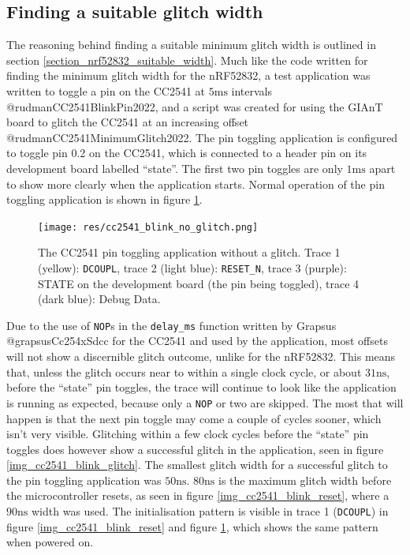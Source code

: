 \hypertarget{finding-a-suitable-glitch-width-1}{%
\subsection{\texorpdfstring{Finding a suitable glitch
width\label{section_cc2541_suitable_width}}{Finding a suitable glitch width}}\label{finding-a-suitable-glitch-width-1}}

The reasoning behind finding a suitable minimum glitch width is outlined
in section \ref{section_nrf52832_suitable_width}. Much like the code
written for finding the minimum glitch width for the nRF52832, a test
application was written to toggle a pin on the CC2541 at
\(5\si{\milli\second}\) intervals @rudmanCC2541BlinkPin2022, and a
script was created for using the GIAnT board to glitch the CC2541 at an
increasing offset @rudmanCC2541MinimumGlitch2022. The pin toggling
application is configured to toggle pin 0.2 on the CC2541, which is
connected to a header pin on its development board labelled ``state''.
The first two pin toggles are only \(1\si{\milli\second}\) apart to show
more clearly when the application starts. Normal operation of the pin
toggling application is shown in figure
\ref{img_cc2541_blink_no_glitch}.

\begin{figure}
\centering
\texttt{[image: res/cc2541\_blink\_no\_glitch.png]}
\caption{The CC2541 pin toggling application without a glitch. Trace 1
(yellow): \texttt{DCOUPL}, trace 2 (light blue): \texttt{RESET\_N},
trace 3 (purple): STATE on the development board (the pin being
toggled), trace 4 (dark blue): Debug Data.
\label{img_cc2541_blink_no_glitch}}
\end{figure}

Due to the use of \texttt{NOP}s in the \texttt{delay\_ms} function
written by Grapsus @grapsusCc254xSdcc for the CC2541 and used by the
application, most offsets will not show a discernible glitch outcome,
unlike for the nRF52832. This means that, unless the glitch occurs near
to within a single clock cycle, or about \(31\si{\nano\second}\), before
the ``state'' pin toggles, the trace will continue to look like the
application is running as expected, because only a \texttt{NOP} or two
are skipped. The most that will happen is that the next pin toggle may
come a couple of cycles sooner, which isn't very visible. Glitching
within a few clock cycles before the ``state'' pin toggles does however
show a successful glitch in the application, seen in figure
\ref{img_cc2541_blink_glitch}. The smallest glitch width for a
successful glitch to the pin toggling application was
\(50\si{\nano\second}\). \(80\si{\nano\second}\) is the maximum glitch
width before the microcontroller resets, as seen in figure
\ref{img_cc2541_blink_reset}, where a \(90\si{\nano\second}\) width was
used. The initialisation pattern is visible in trace 1 (\texttt{DCOUPL})
in figure \ref{img_cc2541_blink_reset} and figure
\ref{img_cc2541_blink_no_glitch}, which shows the same pattern when
powered on.

